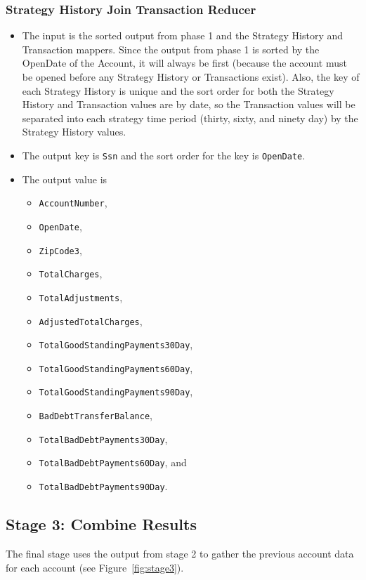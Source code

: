 \subsubsection{Strategy History Join Transaction Reducer}
\begin{itemize}
 \item The input is the sorted output from phase 1 and the Strategy History and
Transaction mappers. Since the output from phase 1 is sorted by the
OpenDate of the Account, it will always be first (because the account must
be opened before any Strategy History or Transactions exist). Also, the key of
each Strategy History is unique and the sort order for both the Strategy History
and Transaction values are by date, so the Transaction values will be separated
into each strategy time period (thirty, sixty, and ninety day) by the Strategy
History values.
 \item The output key is \texttt{Ssn} and the sort order for the key is \texttt{OpenDate}.
 \item The output value is
  \begin{itemize}
  \item \texttt{AccountNumber},
  \item \texttt{OpenDate},
  \item \texttt{ZipCode3},
  \item \texttt{TotalCharges},
  \item \texttt{TotalAdjustments},
  \item \texttt{AdjustedTotalCharges},
  \item \texttt{TotalGoodStandingPayments30Day},
  \item \texttt{TotalGoodStandingPayments60Day},
  \item \texttt{TotalGoodStandingPayments90Day},
  \item  \texttt{BadDebtTransferBalance},
  \item \texttt{TotalBadDebtPayments30Day}, 
  \item \texttt{TotalBadDebtPayments60Day}, and
  \item \texttt{TotalBadDebtPayments90Day}.
  \end{itemize}
\end{itemize}

\subsection{Stage 3: Combine Results}
The final stage uses the output from stage 2 to gather the previous account data for each account (see Figure~\ref{fig:stage3}).

